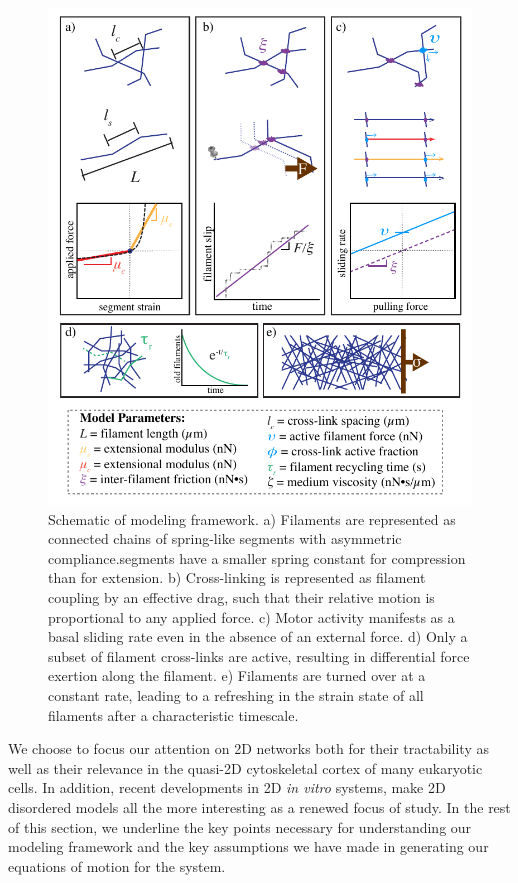 \documentclass[10pt,letterpaper]{article}
\begin{document}
\begin{figure}[h!]
\centering
\includegraphics[width=\hsize]{figures/fig2/fig2}
\caption{\label{fig:sim} Schematic of modeling framework. a) Filaments are represented as connected chains of spring-like segments with asymmetric compliance.segments have a smaller spring constant for compression than for extension. b) Cross-linking is represented as filament coupling by an effective drag, such that their relative motion is proportional to any applied force. c) Motor activity manifests as a basal sliding rate even in the absence of an external force. d) Only a subset of filament cross-links are active, resulting in differential force exertion along the filament.  e)  Filaments are turned over at a constant rate, leading to a refreshing in the strain state of all filaments after a characteristic timescale.}
\end{figure}

We choose to focus our attention on 2D networks both for their tractability as well as their relevance in the quasi-2D cytoskeletal cortex of many eukaryotic cells\cite{cellmech_flows}.  In addition, recent developments in 2D {\em in vitro} systems\cite{rheo_2D1,rheo_2D2}, make 2D disordered models all the more interesting as a renewed focus of study.  In the rest of this section, we underline the key points necessary for understanding our modeling framework and the key assumptions we have made in generating our equations of motion for the system.
\end{document}
